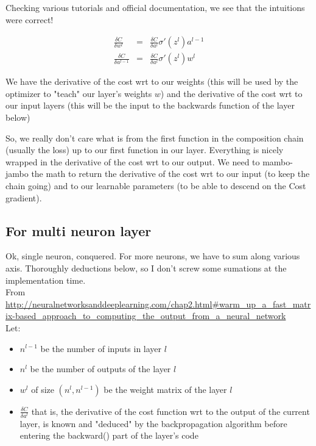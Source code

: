 \documentclass{article}
\begin{document}
Checking various tutorials and official documentation, we see that the intuitions were correct!

\begin{eqnarray}
	\frac{\delta C}{\delta w^l} &=&\frac{\delta C}{\delta a^l} \sigma ' (z^l) a^{l-1}	 \\
	\frac{\delta C}{\delta a^{l-1}}&=&\frac{\delta C}{\delta a^l} \sigma ' (z^l) w^l
\end{eqnarray}

We have the derivative of the cost wrt to our weights (this will be used by the optimizer to "teach" our layer's weights $w$) and the derivative of the cost wrt to our input layers (this will be the input to the backwards function of the layer below)

So, we really don't care what is from the first function in the composition chain (usually the loss) up to our first function in our layer. Everything is nicely wrapped in the derivative of the cost wrt to our output. We need to mambo-jambo the math to return the derivative of the cost wrt to our input (to keep the chain going) and to our learnable parameters (to be able to descend on the Cost gradient).


\subsection{For multi neuron layer}

Ok, single neuron, conquered. For more neurons, we have to sum along various axis. Thoroughly deductions below, so I don't screw some sumations at the implementation time.\\


From \url{http://neuralnetworksanddeeplearning.com/chap2.html#warm_up_a_fast_matrix-based_approach_to_computing_the_output_from_a_neural_network} \\

Let:

\begin{itemize}
	\item $n^{l-1}$ be the number of inputs in layer $l$
	\item $n^l$ be the number of outputs of the layer $l$
	\item $w^l$ of size $(n^l, n^{l-1})$ be the weight matrix of the layer $l$
	\item $\frac{\delta C}{\delta a^l}$ that is, the derivative of the cost function wrt to the output of the current layer, is known and "deduced" by the backpropagation algorithm before entering the backward() part of the layer's code
\end{itemize}
\end{document}
